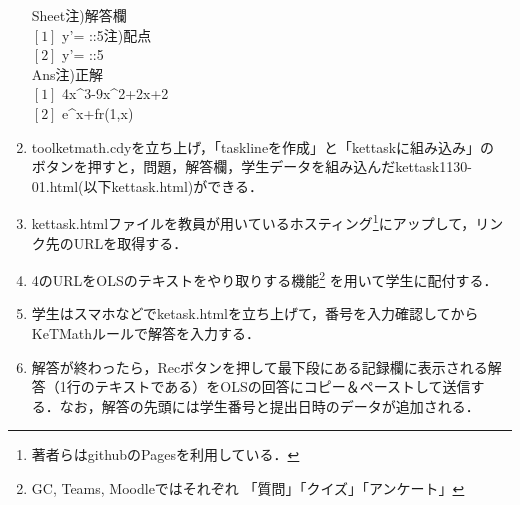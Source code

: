 \documentclass[a4j,12pt]{ujarticle}
\begin{document}
\begin{enumerate}
\begin{minipage}[t]{68mm}
\hspace*{2zw}Sheet\hfill{\small 注)解答欄}\\
\hspace*{2zw}$[1]$ y'=  ::5\hfill{\small 注)配点}\\
\hspace*{2zw}$[2]$ y'=  ::5\\
\hspace*{2zw}Ans\hfill{\small 注)正解}\\
\hspace*{2zw}$[1]$ 4x\^{}3-9x\^{}2+2x+2\\
\hspace*{2zw}$[2]$ e{}\^{}x+fr(1,x)\\
\end{minipage}\vspace{-1mm}

\item toolketmath.cdyを立ち上げ，「tasklineを作成」と「kettaskに組み込み」の
ボタンを押すと，問題，解答欄，学生データを組み込んだkettask1130-01.html(以下kettask.html)ができる．\vspace{-2mm}
\item kettask.htmlファイルを教員が用いているホスティング\footnote{著者らはgithubのPagesを利用している．}にアップして，リンク先のURLを取得する．\vspace{-2mm}
\item 4のURLをOLSのテキストをやり取りする機能\footnote{GC, Teams, Moodleではそれぞれ
「質問」「クイズ」「アンケート」} を用いて学生に配付する．\vspace{-2mm}
\item 学生はスマホなどでketask.htmlを立ち上げて，番号を入力確認してからKeTMathルールで解答を入力する．\vspace{-2mm}
\item 解答が終わったら，Recボタンを押して最下段にある記録欄に表示される解答（1行のテキストである）をOLSの回答にコピー＆ペーストして送信する．なお，解答の先頭には学生番号と提出日時のデータが追加される．\vspace{-1mm}
\end{enumerate}
\end{document}
